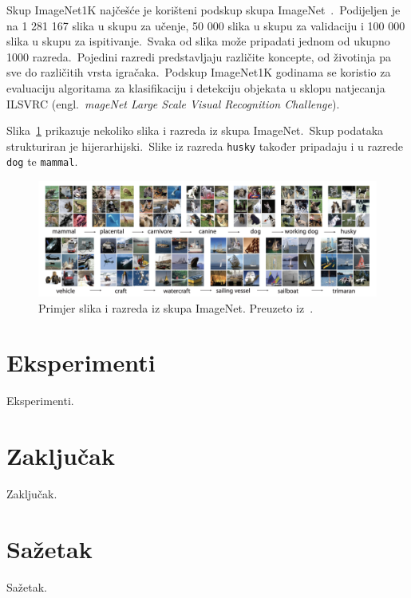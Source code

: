 \documentclass[times, utf8, seminar, numeric]{fer}
\begin{document}
Skup ImageNet1K najčešće je korišteni podskup skupa ImageNet~\cite{deng2009imagenet}.\ 
Podijeljen je na 1 281 167 slika u skupu za učenje, 50 000 slika u skupu za validaciju i 100 000 slika u skupu za ispitivanje.\ 
Svaka od slika može pripadati jednom od ukupno 1000 razreda.\ Pojedini razredi predstavljaju različite koncepte, od životinja pa sve do različitih vrsta igračaka.\ 
Podskup ImageNet1K godinama se koristio za evaluaciju algoritama za klasifikaciju i detekciju objekata u sklopu natjecanja ILSVRC (engl.\ \textit{mageNet Large Scale Visual Recognition Challenge}).\
  
Slika~\ref{fig:imagenet} prikazuje nekoliko slika i razreda iz skupa ImageNet.\ Skup podataka strukturiran je hijerarhijski.\ Slike iz razreda \texttt{husky} također pripadaju i u razrede \texttt{dog} te \texttt{mammal}.\

\begin{figure}[h]
    \centering
    \includegraphics[scale=0.33]{./Slike/imagenet.png}
    \caption{Primjer slika i razreda iz skupa ImageNet. Preuzeto iz~\cite{deng2009imagenet}.}
    \label{fig:imagenet}
\end{figure}

\chapter{Eksperimenti}

Eksperimenti.

\chapter{Zaključak}

Zaključak.




\chapter{Sažetak}
Sažetak.
\end{document}
